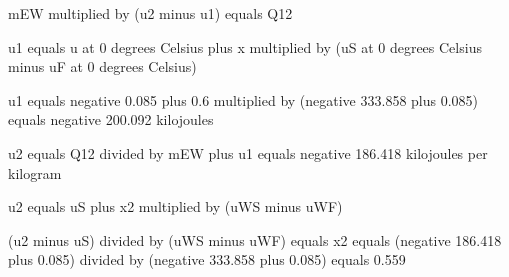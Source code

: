 mEW multiplied by (u2 minus u1) equals Q12  

u1 equals u at 0 degrees Celsius plus x multiplied by (uS at 0 degrees Celsius minus uF at 0 degrees Celsius)  

u1 equals negative 0.085 plus 0.6 multiplied by (negative 333.858 plus 0.085) equals negative 200.092 kilojoules  

u2 equals Q12 divided by mEW plus u1 equals negative 186.418 kilojoules per kilogram  

u2 equals uS plus x2 multiplied by (uWS minus uWF)  

(u2 minus uS) divided by (uWS minus uWF) equals x2 equals (negative 186.418 plus 0.085) divided by (negative 333.858 plus 0.085) equals 0.559